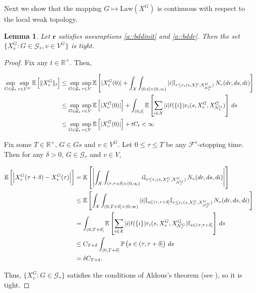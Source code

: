 \documentclass[12pt]{article}
\newcommand{\mb}{\mathbb}
\newcommand{\mc}{\mathcal}
\newcommand{\ov}{\overline}
\newcommand{\te}{\text}
\newcommand{\ind}{\hspace{24pt}}
\newcommand{\pr}{\mb{P}}							%
\newcommand{\ex}[1]{\mb{E}\left[#1\right]}			%
\newcommand{\sta}{\mc{X}}							%
\newcommand{\gneigh}[2]{\mc{N}^{#1}_{#2}}			%
\newcommand{\cl}[1]{\ov{#1}}						%
\newcommand{\Xf}{X}									%
\newcommand{\poiss}{N}								%
\newcommand{\Sm}{\ell}								%
\newcommand{\rate}{r}								%
\newcommand{\F}{\mc{F}}								%
\newcommand{\poissv}[1]{_{#1}}						%
\newcommand{\vind}[1]{_{#1}}						%
\newcommand{\tme}[1]{(#1)}							%
\newcommand{\gind}[1]{^{#1}}						%
\newcommand{\vpara}[1]{^{#1}}						%
\newcommand{\stpara}[1]{_{#1}}						%
\newcommand{\tpara}[1]{_{#1}}						%
\newcommand{\rateset}{\mathbf{\rate}}				%
\newcommand{\jumpbd}[1]{C_{#1}}						%
\newcommand{\Gs}{\mc{G}_\ast}						%
\newcommand{\tmepro}[3]{
\ifstrempty{#3}{
	(#1,#2)}{
	(#1,#2,#3)}}									%
\newcommand{\rt}{\tau}								%
\newcommand{\law}{\te{Law}}							%
\newtheorem{lem}[thms]{Lemma}
\begin{document}
\ind Next we show that the mapping \(G \mapsto \law(\Xf\gind{G})\) is continuous with respect to the local weak topology.

\begin{lem}
Let \(\rateset\) satisfies assumptions \ref{a::bddinit} and \ref{a::bddr}. Then the set \(\{\Xf\gind{G}\vind{v}:G \in \Gs, v\in V\gind{G}\}\) is tight.
\label{wp::tight}
\end{lem}
\begin{proof}
Fix any \(t \in \mb{R}^+\). Then,

\begin{align*}
\sup_{G\in \Gs}\sup_{v \in V\gind{G}} \ex{\|\Xf\gind{G}\vind{v}\|\tpara{t}} &\leq \sup_{G\in \Gs}\sup_{v \in V}\ex{|\Xf\gind{G}\vind{v}\tme{0}| + \int_\sta\int_{(0,t]\times(0,\infty)} |i|\mb{I}_{r \leq \rate\stpara{i}\tmepro{s}{\Xf\gind{G}\vind{v}}{\Xf\gind{G}\vind{\gneigh{G}{v}}}}\,\poiss\poissv{v}(dr,ds,di)}\\
&\leq \sup_{G\in \Gs}\sup_{v \in V}\ex{|\Xf\gind{G}\vind{v}\tme{0}|} + \int_{(0,t]}\ex{\sum_{i\in \sta}|i|\Sm(\{i\})\rate\stpara{i}\tmepro{s}{\Xf\gind{G}\vind{v}}{\Xf\gind{G}\vind{\gneigh{G}{v}}}}\,ds\\
&\leq \sup_{G\in \Gs}\sup_{v \in V}\ex{|\Xf\gind{G}\vind{v}\tme{0}|} + t\jumpbd{t} < \infty
\end{align*}

Fix some \(T \in \mb{R}^+\), \(G \in Gs\) and \(v \in V\gind{G}\). Let \(0 \leq \rt \leq T\) be any \(\F\vpara{\cl{v}}\)-stopping time. Then for any \(\delta > 0\), \(G \in \Gs\) and \(v \in V\),

\begin{align*}
\ex{\left|\Xf\gind{G}\vind{v}\tme{\rt + \delta} - \Xf\gind{G}\vind{v}\tme{\rt}\right|} &= \ex{\left|\int_\sta\int_{(\rt,\rt+\delta]\times (0,\infty)} i\mb{I}_{r \leq \rate\stpara{i}\tmepro{s}{\Xf\gind{G}\vind{v}}{\Xf\gind{G}\vind{\gneigh{G}{v}}}}\,\poiss\poissv{v}(dr,ds,di)\right|}\\
&\leq \ex{\int_\sta\int_{(0,T+\delta]\times (0,\infty)} |i|\mb{I}_{s \in (\rt,\rt+\delta]}\mb{I}_{r \leq \rate\stpara{i}\tmepro{s}{\Xf\gind{G}\vind{v}}{\Xf\gind{G}\vind{\gneigh{G}{v}}}}\,\poiss\poissv{v}(dr,ds,di)}\\
&= \int_{(0,T + \delta]}\ex{\sum_{i\in \sta} |i|\Sm(\{i\})\rate\stpara{i}\tmepro{s}{\Xf\gind{G}\vind{v}}{\Xf\gind{G}\vind{\gneigh{G}{v}}}\mb{I}_{s \in (\rt,\rt+\delta]}}\,ds\\
&\leq \jumpbd{T+\delta}\int_{(0,T+\delta]} \pr\left(s \in (\rt,\rt+\delta]\right)\,ds\\
&= \delta\jumpbd{T + \delta}.
\end{align*}

Thus, \(\{\Xf\gind{G}\vind{v}:G \in \Gs\}\) satisfies the conditions of Aldous's theorem (see \cite[Theorem 16.10]{Bil99}), so it is tight.
\end{proof}
\end{document}
